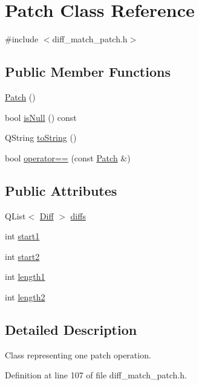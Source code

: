 \hypertarget{class_patch}{
\section{Patch Class Reference}
\label{class_patch}
}


{\ttfamily \#include $<$diff\_\-match\_\-patch.h$>$}

\subsection*{Public Member Functions}
\begin{DoxyCompactItemize}
\item 
\hyperlink{class_patch_a65fdd4bb128b8f50c1b9dcc008f20360}{Patch} ()
\item 
bool \hyperlink{class_patch_afdc9aba846465494845201a26d0fc20f}{isNull} () const 
\item 
QString \hyperlink{class_patch_a53799d5296a89879d88f76c8f10602e7}{toString} ()
\item 
bool \hyperlink{class_patch_a2159b94942e91391e8d4e29d06735286}{operator==} (const \hyperlink{class_patch}{Patch} \&)
\end{DoxyCompactItemize}
\subsection*{Public Attributes}
\begin{DoxyCompactItemize}
\item 
QList$<$ \hyperlink{class_diff}{Diff} $>$ \hyperlink{class_patch_a5017c7eb1118cc8ebe7030dd7a86475a}{diffs}
\item 
int \hyperlink{class_patch_ae2fbf0aefd6ab5aeec4379cf388ff158}{start1}
\item 
int \hyperlink{class_patch_a1ceab2853be39f706627f98e4d2ad8d6}{start2}
\item 
int \hyperlink{class_patch_a6f1d748d94184a8f492bece1f967777d}{length1}
\item 
int \hyperlink{class_patch_a9ef05324cac27ec93ebd0be4270e9d1e}{length2}
\end{DoxyCompactItemize}


\subsection{Detailed Description}
Class representing one patch operation. 

Definition at line 107 of file diff\_\-match\_\-patch.h.




